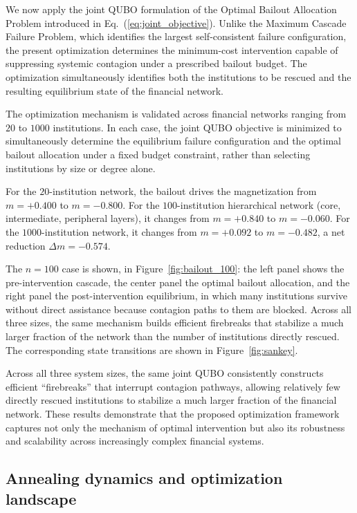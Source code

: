 \documentclass[aps,reprint,superscriptaddress,pra]{revtex4-2}
\begin{document}
We now apply the joint QUBO formulation of the Optimal Bailout Allocation Problem introduced in Eq.~(\ref{eq:joint_objective}). Unlike the Maximum Cascade Failure Problem, which identifies the largest self-consistent failure configuration, the present optimization determines the minimum-cost intervention capable of suppressing systemic contagion under a prescribed bailout budget. The optimization simultaneously identifies both the institutions to be rescued and the resulting equilibrium state of the financial network.

The optimization mechanism is validated across financial networks ranging
from $20$ to $1000$ institutions. In each case, the joint QUBO objective is
minimized to simultaneously determine the equilibrium failure
configuration and the optimal bailout allocation under a fixed budget
constraint, rather than selecting institutions by size or degree alone.

For the $20$-institution network, the bailout drives the magnetization
from $m=+0.400$ to $m=-0.800$. For the $100$-institution hierarchical
network (core, intermediate, peripheral layers), it changes from
$m=+0.840$ to $m=-0.060$. For the $1000$-institution network, it changes
from $m=+0.092$ to $m=-0.482$, a net reduction $\Delta m=-0.574$.

The $n=100$ case is shown, in Figure~\ref{fig:bailout_100}: the left
panel shows the pre-intervention cascade, the center panel the optimal
bailout allocation, and the right panel the post-intervention equilibrium,
in which many institutions survive without direct assistance because
contagion paths to them are blocked. Across all three sizes, the same
mechanism builds efficient firebreaks that stabilize a much larger
fraction of the network than the number of institutions directly rescued. The corresponding state transitions are shown in Figure~\ref{fig:sankey}.
 
Across all three system sizes, the same joint QUBO consistently constructs efficient ``firebreaks'' that interrupt contagion pathways, allowing relatively few directly rescued institutions to stabilize a much larger fraction of the financial network. These results demonstrate that the proposed optimization framework captures not only the mechanism of optimal intervention but also its robustness and scalability across increasingly complex financial systems.

\subsection{Annealing dynamics and optimization landscape}
\end{document}
